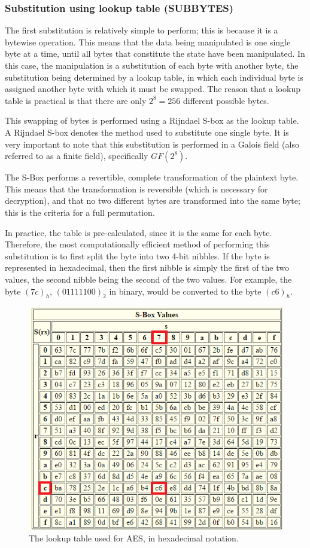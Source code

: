 \documentclass[12pt]{report}
\theoremstyle{definition}
\theoremstyle{remark}
\begin{document}
\subsubsection{Substitution using lookup table (SUBBYTES)}
The first substitution is relatively simple to perform; this is because it is a bytewise operation. This means that the data being manipulated is one single byte at a time, until all bytes that constitute the state have been manipulated. In this case, the manipulation is a substitution of each byte with another byte, the substitution being determined by a lookup table, in which each individual byte is assigned another byte with which it must be swapped. The reason that a lookup table is practical is that there are only $2^8 = 256$ different possible bytes.

This swapping of bytes is performed using a Rijndael S-box as the lookup table. A Rijndael S-box denotes the method used to substitute one single byte. It is very important to note that this substitution is performed in a Galois field (also referred to as a finite field)\cite{GaloisField}, specifically $GF(2^8)$.

The S-Box performs a revertible, complete transformation of the plaintext byte\cite{SBox}. This means that the transformation is reversible (which is necessary for decryption), and that no two different bytes are transformed into the same byte; this is the criteria for a full permutation.

In practice, the table is pre-calculated, since it is the same for each byte. Therefore, the most computationally efficient method of performing this substitution is to first split the byte into two 4-bit nibbles. If the byte is represented in hexadecimal, then the first nibble is simply the first of the two values, the second nibble being the second of the two values. For example, the byte $(7c)_h$, $(01111100)_2$ in binary, would be converted to the byte $(c6)_h$.

\begin{figure}[H]
\centering
\includegraphics[scale=1]{SBox.PNG}
\caption{The lookup table used for AES, in hexadecimal notation\cite{SBox}.}
\end{figure}
\end{document}

